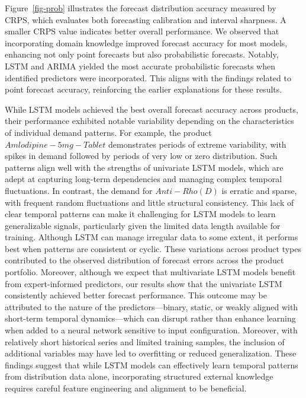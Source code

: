 \documentclass[
  authoryear,
  preprint,
  3p]{elsarticle}
\begin{document}
Figure~\ref{fig-prob} illustrates the forecast distribution accuracy
measured by CRPS, which evaluates both forecasting calibration and
interval sharpness. A smaller CRPS value indicates better overall
performance. We observed that incorporating domain knowledge improved
forecast accuracy for most models, enhancing not only point forecasts
but also probabilistic forecasts. Notably, LSTM and ARIMA yielded the
most accurate probabilistic forecasts when identified predictors were
incorporated. This aligns with the findings related to point forecast
accuracy, reinforcing the earlier explanations for these results.

While LSTM models achieved the best overall forecast accuracy across
products, their performance exhibited notable variability depending on
the characteristics of individual demand patterns. For example, the
product \(Amlodipine - 5mg - Tablet\) demonstrates periods of extreme
variability, with spikes in demand followed by periods of very low or
zero distribution. Such patterns align well with the strengths of
univariate LSTM models, which are adept at capturing long-term
dependencies and managing complex temporal fluctuations. In contrast,
the demand for \(Anti-Rho (D)\) is erratic and sparse, with frequent
random fluctuations and little structural consistency. This lack of
clear temporal patterns can make it challenging for LSTM models to learn
generalizable signals, particularly given the limited data length
available for training. Although LSTM can manage irregular data to some
extent, it performs best when patterns are consistent or cyclic. These
variations across product types contributed to the observed distribution
of forecast errors across the product portfolio. Moreover, although we
expect that multivariate LSTM models benefit from expert-informed
predictors, our results show that the univariate LSTM consistently
achieved better forecast performance. This outcome may be attributed to
the nature of the predictors---binary, static, or weakly aligned with
short-term temporal dynamics---which can disrupt rather than enhance
learning when added to a neural network sensitive to input
configuration. Moreover, with relatively short historical series and
limited training samples, the inclusion of additional variables may have
led to overfitting or reduced generalization. These findings suggest
that while LSTM models can effectively learn temporal patterns from
distribution data alone, incorporating structured external knowledge
requires careful feature engineering and alignment to be beneficial.
\end{document}
